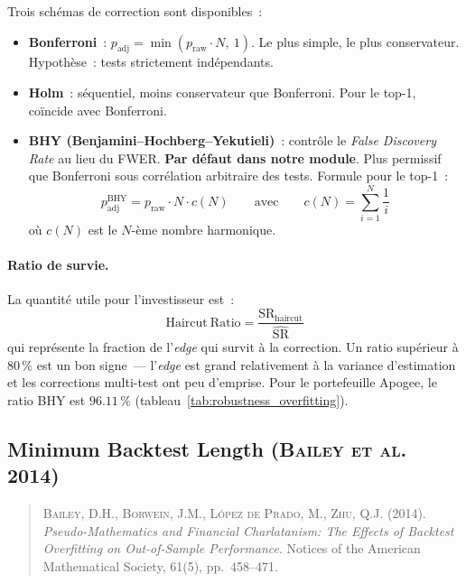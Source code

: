 Trois schémas de correction sont disponibles~:

\begin{itemize}
\item \textbf{Bonferroni}~: $p_{\text{adj}} = \min(p_{\text{raw}} \cdot N,\ 1)$. Le plus simple, le plus conservateur. Hypothèse~: tests strictement indépendants.
\item \textbf{Holm}~: séquentiel, moins conservateur que Bonferroni. Pour le top-1, coïncide avec Bonferroni.
\item \textbf{BHY (Benjamini--Hochberg--Yekutieli)}~: contrôle le \emph{False Discovery Rate} au lieu du FWER. \textbf{Par défaut dans notre module}. Plus permissif que Bonferroni sous corrélation arbitraire des tests. Formule pour le top-1~:
\begin{equation}
p_{\text{adj}}^{\text{BHY}} = p_{\text{raw}} \cdot N \cdot c(N)
\qquad\text{avec}\qquad
c(N) = \sum_{i=1}^{N} \frac{1}{i}
\label{eq:bhy_correction}
\end{equation}
où $c(N)$ est le $N$-ème nombre harmonique.
\end{itemize}

\paragraph{Ratio de survie.} La quantité utile pour l'investisseur est~:
\begin{equation}
\mathrm{Haircut\ Ratio} = \frac{\mathrm{SR}_{\text{haircut}}}{\widehat{\mathrm{SR}}}
\label{eq:haircut_ratio}
\end{equation}
qui représente la fraction de l'\emph{edge} qui survit à la correction. Un ratio supérieur à $80\,\%$ est un bon signe~--- l'\emph{edge} est grand relativement à la variance d'estimation et les corrections multi-test ont peu d'emprise. Pour le portefeuille Apogee, le ratio BHY est $96.11\,\%$ (tableau~\ref{tab:robustness_overfitting}).

\subsection{Minimum Backtest Length (\textsc{Bailey et al.} 2014)}
\label{app:minbtl}

\begin{quote}\small
\textsc{Bailey}, D.H., \textsc{Borwein}, J.M., \textsc{L\'opez de Prado}, M., \textsc{Zhu}, Q.J. (2014). \emph{Pseudo-Mathematics and Financial Charlatanism: The Effects of Backtest Overfitting on Out-of-Sample Performance}. Notices of the American Mathematical Society, 61(5), pp.~458--471.
\end{quote}

